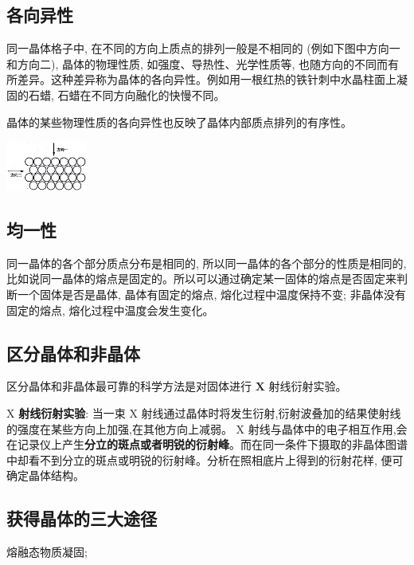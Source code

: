 \documentclass[10pt,cn]{elegantbook}
\begin{document}
\subsection{各向异性}

 同一晶体格子中, 在不同的方向上质点的排列一般是不相同的 (例如下图中方向一和方向二), 晶体的物理性质, 如强度、导热性、光学性质等, 也随方向的不同而有所差异。这种差异称为晶体的各向异性。例如用一根红热的铁针刺中水晶柱面上凝固的石蜡, 石蜡在不同方向融化的快慢不同。

晶体的某些物理性质的各向异性也反映了晶体内部质点排列的有序性。


\begin{center}
	\includegraphics[max width=0.2\textwidth]{image/c106.jpg}
\end{center}

\subsection{均一性}

 同一晶体的各个部分质点分布是相同的, 所以同一晶体的各个部分的性质是相同的, 比如说同一晶体的熔点是固定的。所以可以通过确定某一固体的熔点是否固定来判断一个固体是否是晶体, 晶体有固定的熔点, 熔化过程中温度保持不变; 非晶体没有固定的熔点, 熔化过程中温度会发生变化。

\subsection{区分晶体和非晶体}

区分晶体和非晶体最可靠的科学方法是对固体进行 \(\mathbf{X}\) 射线衍射实验。

\(\mathrm{X}\) \textbf{射线衍射实验}: 当一束 \(\mathrm{X}\) 射线通过晶体时将发生衍射,衍射波叠加的结果使射线的强度在某些方向上加强,在其他方向上减弱。 \(\mathrm{X}\) 射线与晶体中的电子相互作用,会在记录仪上产生\textbf{分立的斑点或者明锐的衍射峰}。而在同一条件下摄取的非晶体图谱中却看不到分立的斑点或明锐的衍射峰。分析在照相底片上得到的衍射花样, 便可确定晶体结构。

\subsection{获得晶体的三大途径}

 熔融态物质凝固;
\end{document}

